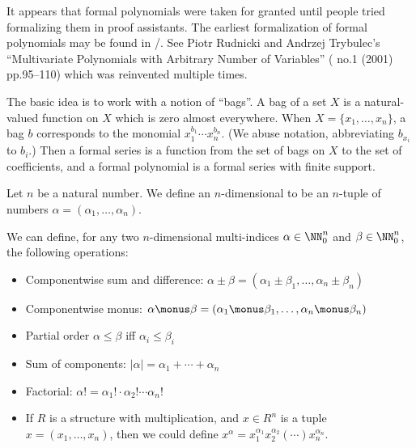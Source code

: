 \begin{remark}
It appears that formal polynomials were taken for granted until people
tried formalizing them in proof assistants. The earliest formalization
of formal polynomials may be found in \Mizar/. See Piotr Rudnicki
and Andrzej Trybulec's ``Multivariate Polynomials with Arbitrary
Number of Variables'' (
no.1 (2001) pp.95--110) which was reinvented multiple times.\nocite{rudnicki2001multivariate}

The basic idea is to work with a notion of ``bags''. A bag of a set
$X$ is a natural-valued function on $X$ which is zero almost everywhere.
When $X=\{x_{1},\dots,x_{n}\}$, a bag $b$ corresponds to the monomial
$x_{1}^{b_{1}}\cdots x_{n}^{b_{n}}$. (We abuse notation, abbreviating
$b_{x_{i}}$ to $b_{i}$.) Then a formal series is a
function from the set of bags on $X$ to the set of coefficients, and a
formal polynomial is a formal series with finite support.
\end{remark}

\begin{definition}
Let $n$ be a natural number. We define an $n$-dimensional 
to be an $n$-tuple of numbers
$\alpha=(\alpha_{1},\dots,\alpha_{n})$.

We can define, for any two $n$-dimensional multi-indices
$\alpha\in\NN_{0}^{n}$ and $\beta\in\NN_{0}^{n}$, the following
operations:
\begin{itemize}
\item Componentwise sum and difference: $\alpha\pm\beta=(\alpha_{1}\pm\beta_{1},\dots,\alpha_{n}\pm\beta_{n})$
\item Componentwise monus: $\alpha\monus\beta=(\alpha_{1}\monus\beta_{1},\dots,\alpha_{n}\monus\beta_{n})$
\item Partial order $\alpha\leq\beta$ iff $\alpha_{i}\leq\beta_{i}$
\item Sum of components: $|\alpha|=\alpha_{1}+\cdots+\alpha_{n}$
\item Factorial: $\alpha!=\alpha_{1}!\cdot\alpha_{2}!\cdots\alpha_{n}!$
\item If $R$ is a structure with multiplication, and $x\in R^{n}$ is a
  tuple $x=(x_{1},\dots,x_{n})$, then we
  could define $x^{\alpha} = x_{1}^{\alpha_{1}}x_{2}^{\alpha_{2}}(\cdots)x_{n}^{\alpha_{n}}$.
\end{itemize}
\end{definition}


